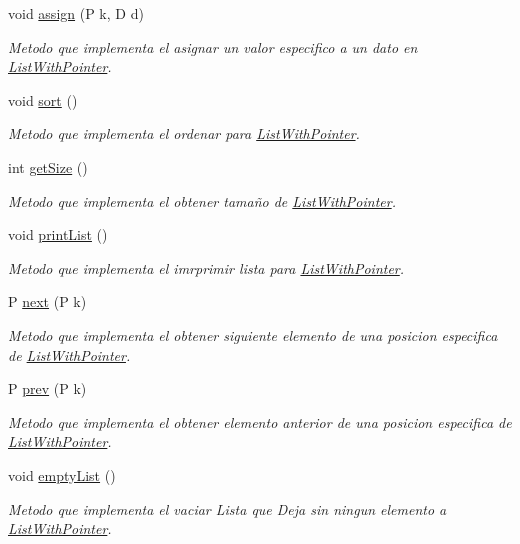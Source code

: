 \begin{DoxyCompactItemize}
void \hyperlink{class_list_with_pointer_aeaa834b22c4d7276a77ff29df3da7a30}{assign} (P k, D d)
\begin{DoxyCompactList}\small\item\em Metodo que implementa el asignar un valor especifico a un dato en \hyperlink{class_list_with_pointer}{List\+With\+Pointer}. \end{DoxyCompactList}\item 
void \hyperlink{class_list_with_pointer_aa46631b2da29895d1f767626fb591bc8}{sort} ()
\begin{DoxyCompactList}\small\item\em Metodo que implementa el ordenar para \hyperlink{class_list_with_pointer}{List\+With\+Pointer}. \end{DoxyCompactList}\item 
int \hyperlink{class_list_with_pointer_ac70c49b5703887fd867e90cdac3c706f}{get\+Size} ()
\begin{DoxyCompactList}\small\item\em Metodo que implementa el obtener tamaño de \hyperlink{class_list_with_pointer}{List\+With\+Pointer}. \end{DoxyCompactList}\item 
void \hyperlink{class_list_with_pointer_a7079b5f1dbddb87a7e33ffc71ebb7b92}{print\+List} ()
\begin{DoxyCompactList}\small\item\em Metodo que implementa el imrprimir lista para \hyperlink{class_list_with_pointer}{List\+With\+Pointer}. \end{DoxyCompactList}\item 
P \hyperlink{class_list_with_pointer_a518b5ee89e3ad32ae7cd4ddd5d4fa7e9}{next} (P k)
\begin{DoxyCompactList}\small\item\em Metodo que implementa el obtener siguiente elemento de una posicion especifica de \hyperlink{class_list_with_pointer}{List\+With\+Pointer}. \end{DoxyCompactList}\item 
P \hyperlink{class_list_with_pointer_a7242068fcc3a193f0f7e94517856e431}{prev} (P k)
\begin{DoxyCompactList}\small\item\em Metodo que implementa el obtener elemento anterior de una posicion especifica de \hyperlink{class_list_with_pointer}{List\+With\+Pointer}. \end{DoxyCompactList}\item 
void \hyperlink{class_list_with_pointer_aec4f5374971962c79d397bbcd0080199}{empty\+List} ()
\begin{DoxyCompactList}\small\item\em Metodo que implementa el vaciar Lista que Deja sin ningun elemento a \hyperlink{class_list_with_pointer}{List\+With\+Pointer}. \end{DoxyCompactList}\end{DoxyCompactItemize}
